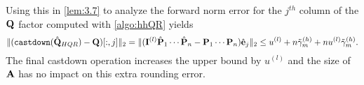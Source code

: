 Using this in \cref{lem:3.7} to analyze the forward norm error for the $j^{th}$ column of the $\mathbf{Q}$ factor computed with \cref{algo:hhQR} yields
\begin{equation}
	\|(\text{\tt castdown}(\hat{\bb{Q}}_{HQR})- \bb{Q})[:,j]\|_2 = \|(\bb{I}^{(l)}\hat{\bb{P}}_{1}\cdots\hat{\bb{P}}_{n}-\bb{P}_{1}\cdots\bb{P}_{n})\hat{\bb{e}}_j\|_2 \leq u^{(l)}+n\tilde{\gamma}_m^{(h)} + nu^{(l)}\tilde{\gamma}_m^{(h)}.\label{eqn:HQR-mp}
\end{equation}
The final castdown operation increases the upper bound by $u^{(l)}$ and the size of $\mathbf{A}$ has no impact on this extra rounding error. 
